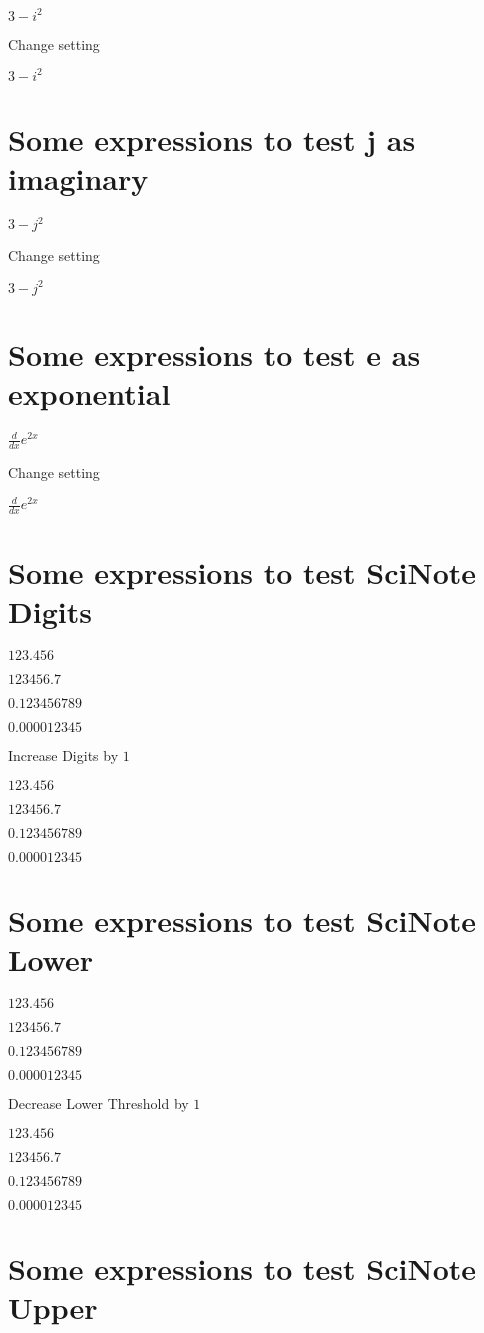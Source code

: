 \documentclass{article}
\begin{document}
$3-i^{2}$

Change setting

$3-i^{2}$

\section{Some expressions to test j as imaginary}

$3-j^{2}$

Change setting

$3-j^{2}$

\section{Some expressions to test e as exponential}

$\frac{d}{dx}e^{2x}$

Change setting

$\frac{d}{dx}e^{2x}$

\noindent \hrulefill

\section{Some expressions to test SciNote Digits}

$123.456$

$123456.7$

$0.123456789$

$0.000012345$

Increase Digits by $1$

$123.456$

$123456.7$

$0.123456789$

$0.000012345$

\section{Some expressions to test SciNote Lower}

$123.456$

$123456.7$

$0.123456789$

$0.000012345$

Decrease Lower Threshold by $1$

$123.456$

$123456.7$

$0.123456789$

$0.000012345$

\section{Some expressions to test SciNote Upper}
\end{document}
